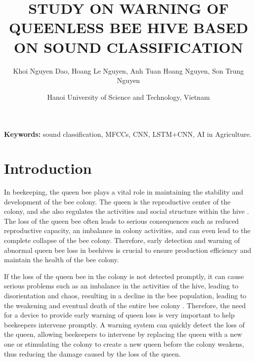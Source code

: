 \documentclass[twocolumn]{article}
\title{STUDY ON WARNING OF QUEENLESS \break BEE HIVE BASED ON SOUND CLASSIFICATION}
\author{\normalsize Khoi Nguyen Dao, Hoang Le Nguyen, Anh Tuan Hoang Nguyen, Son Trung Nguyen}
\date{\normalsize Hanoi University of Science and Technology, Vietnam}
\begin{document}
\maketitle


\noindent\textbf{Keywords:} sound classification, MFCCs, CNN, LSTM+CNN, AI in Agriculture.


\vspace{-1em}
\section{Introduction}
In beekeeping, the queen bee plays a vital role in maintaining the stability and development
of the bee colony. The queen is the reproductive center of the colony, and she also regulates
the activities and social structure within the hive \cite{anton2022introduction}. The loss of the queen bee
often leads to serious consequences such as reduced reproductive capacity, an imbalance in
colony activities, and can even lead to the complete collapse of the bee colony. Therefore,
early detection and warning of abnormal queen bee loss in beehives is crucial to ensure
production efficiency and maintain the health of the bee colony.

If the loss of the queen bee in the colony is not detected promptly, it can cause serious
problems such as an imbalance in the activities of the hive, leading to disorientation and
chaos, resulting in a decline in the bee population, leading to the weakening and eventual
death of the entire bee colony \cite{honey_bee_colony_2021}. Therefore, the need for a device to provide early
warning of queen loss is very important to help beekeepers intervene promptly. A warning
system can quickly detect the loss of the queen, allowing beekeepers to intervene by
replacing the queen with a new one or stimulating the colony to create a new queen before
the colony weakens, thus reducing the damage caused by the loss of the queen.
\end{document}
